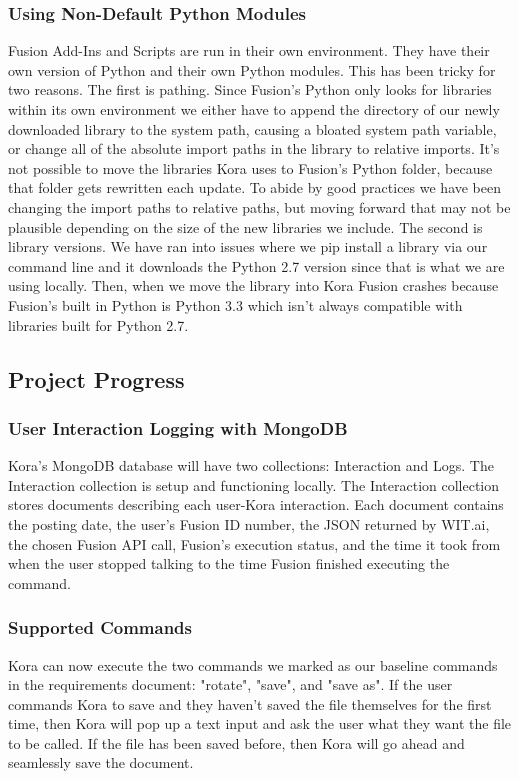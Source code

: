 \documentclass[onecolumn, draftclsnofoot,10pt, compsoc]{IEEEtran}
\begin{document}
    
	    \subsubsection{Using Non-Default Python Modules}
		    Fusion Add-Ins and Scripts are run in their own environment.
		    They have their own version of Python and their own Python modules.
		    This has been tricky for two reasons.
		    The first is pathing.
		    Since Fusion's Python only looks for libraries within its own environment we either have to append the directory of our newly downloaded library to the system path, causing a bloated system path variable, or change all of the absolute import paths in the library to relative imports.
		    It's not possible to move the libraries Kora uses to Fusion's Python folder, because that folder gets rewritten each update.
		    To abide by good practices we have been changing the import paths to relative paths, but moving forward that may not be plausible depending on the size of the new libraries we include.
		    The second is library versions.
		    We have ran into issues where we pip install a library via our command line and it downloads the Python 2.7 version since that is what we are using locally.
		    Then, when we move the library into Kora Fusion crashes because Fusion's built in Python is Python 3.3 which isn't always compatible with libraries built for Python 2.7.

		
	\subsection{Project Progress}
		\subsubsection{User Interaction Logging with MongoDB}
			Kora's MongoDB database will have two collections: Interaction and Logs.
			The Interaction collection is setup and functioning locally.
			The Interaction collection stores documents describing each user-Kora interaction.
			Each document contains the posting date, the user's Fusion ID number, the JSON returned by WIT.ai, the chosen Fusion API call, Fusion's execution status, and the time it took from when the user stopped talking to the time Fusion finished executing the command.
			
			
		\subsubsection{Supported Commands}
			Kora can now execute the two commands we marked as our baseline commands in the requirements document: "rotate", "save", and "save as".
			If the user commands Kora to save and they haven't saved the file themselves for the first time, then Kora will pop up a text input and ask the user what they want the file to be called.
			If the file has been saved before, then Kora will go ahead and seamlessly save the document.
			
\end{document}
